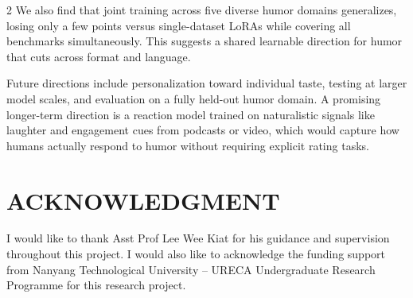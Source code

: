 \documentclass[10pt, a4paper]{article}
\begin{document}
\begin{multicols}{2}
We also find that joint training across five diverse humor domains generalizes, losing only a few points versus single-dataset LoRAs while covering all benchmarks simultaneously. This suggests a shared learnable direction for humor that cuts across format and language.

Future directions include personalization toward individual taste, testing at larger model scales, and evaluation on a fully held-out humor domain. A promising longer-term direction is a reaction model trained on naturalistic signals like laughter and engagement cues from podcasts or video, which would capture how humans actually respond to humor without requiring explicit rating tasks.

\section*{ACKNOWLEDGMENT}

I would like to thank Asst Prof Lee Wee Kiat for his guidance and supervision throughout this project. I would also like to acknowledge the funding support from Nanyang Technological University -- URECA Undergraduate Research Programme for this research project.

\end{multicols}
\end{document}

